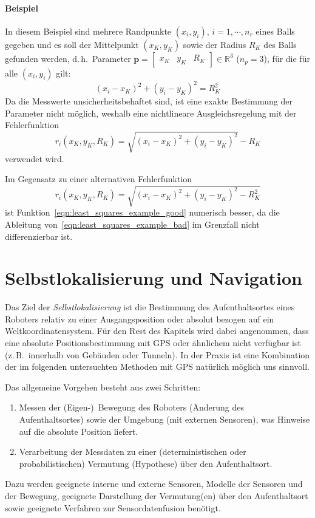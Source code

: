 \documentclass[a4paper, 11pt, accentcolor = tud3b]{tudreport}
\newcommand{\R}{\mathbb{R}}
\renewcommand{\vec}[1]{\boldsymbol{\mathbf{#1}}}
\renewcommand{\dh}{d.\,h.~}
\newcommand{\zB}{z.\,B.~}
\begin{document}
				\paragraph{Beispiel}
					In diesem Beispiel sind mehrere Randpunkte \( (x_i, y_i) \), \( i = 1, \cdots, n_r \) eines Balls gegeben und es soll der Mittelpunkt \( (x_K, y_K) \) sowie der Radius \( R_K \) des Balls gefunden werden, \dh Parameter \( \vec{p} = \begin{bmatrix} x_K & y_K & R_K \end{bmatrix} \in \R^3 \) (\( n_p = 3 \)), für die für alle \( (x_i, y_i) \) gilt:
					\begin{equation*}
						(x_i - x_K)^2 + (y_i - y_K)^2 = R_K^2 \tag{Kreisgleichung}
					\end{equation*}
					Da die Messwerte unsicherheitsbehaftet sind, ist eine exakte Bestimmung der Parameter nicht möglich, weshalb eine nichtlineare Ausgleichsregelung mit der Fehlerfunktion
					\begin{equation}
						r_i(x_K, y_K, R_K) = \sqrt{(x_i - x_K)^2 + (y_i - y_K)^2} - R_K \label{eqn:least_squares_example_good}
					\end{equation}
					verwendet wird.
					
					Im Gegensatz zu einer alternativen Fehlerfunktion
					\begin{equation}
						r_i(x_K, y_K, R_K) = \sqrt{(x_i - x_K)^2 + (y_i - y_K)^2 - R_K^2} \label{eqn:least_squares_example_bad}
					\end{equation}
					ist Funktion~\ref{eqn:least_squares_example_good} numerisch besser, da die Ableitung von~\ref{eqn:least_squares_example_bad} im Grenzfall nicht differenzierbar ist.

		\section{Selbstlokalisierung und Navigation}
			Das Ziel der \emph{Selbstlokalisierung} ist die Bestimmung des Aufenthaltsortes eines Roboters relativ zu einer Ausgangsposition oder absolut bezogen auf ein Weltkoordinatensystem. Für den Rest des Kapitels wird dabei angenommen, dass eine absolute Positionsbestimmung mit GPS oder ähnlichem nicht verfügbar ist (\zB innerhalb von Gebäuden oder Tunneln). In der Praxis ist eine Kombination der im folgenden untersuchten Methoden mit GPS natürlich möglich uns sinnvoll.
			
			Das allgemeine Vorgehen besteht aus zwei Schritten:
			\begin{enumerate}
				\item Messen der (Eigen-)~Bewegung des Roboters (Änderung des Aufenthaltsortes) sowie der Umgebung (mit externen Sensoren), was Hinweise auf die absolute Position liefert.
				\item Verarbeitung der Messdaten zu einer (deterministischen oder probabilistischen) Vermutung (Hypothese) über den Aufenthaltsort.
			\end{enumerate}
			Dazu werden geeignete interne und externe Sensoren, Modelle der Sensoren und der Bewegung, geeignete Darstellung der Vermutung(en) über den Aufenthaltsort sowie geeignete Verfahren zur Sensordatenfusion benötigt.
			
\end{document}
